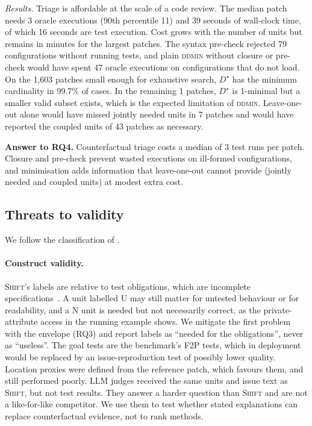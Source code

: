 \documentclass[a4paper,fleqn]{cas-sc}
\newcommand{\tool}{\textsc{Shift}}
\newcommand{\lab}[1]{\textsf{#1}}
\newcommand{\rqfourCallsMedian}{3}
\newcommand{\rqfourCallsPninety}{11}
\newcommand{\rqfourCoupled}{43}
\newcommand{\rqfourExhLarger}{1}
\newcommand{\rqfourExhMatch}{99.7\%}
\newcommand{\rqfourExhN}{1{,}603}
\newcommand{\rqfourOracleSecMedian}{16}
\newcommand{\rqfourPatchesJ}{7}
\newcommand{\rqfourPlainInvalid}{47}
\newcommand{\rqfourPrecheck}{79}
\newcommand{\rqfourWallMedian}{39}
\begin{document}
\emph{Results.} Triage is affordable at the scale of a code review. The median patch needs \rqfourCallsMedian{} oracle executions (90th percentile \rqfourCallsPninety{}) and \rqfourWallMedian{} seconds of wall-clock time, of which \rqfourOracleSecMedian{} seconds are test execution. Cost grows with the number of units but remains in minutes for the largest patches. The syntax pre-check rejected \rqfourPrecheck{} configurations without running tests, and plain \textsc{ddmin} without closure or pre-check would have spent \rqfourPlainInvalid{} oracle executions on configurations that do not load. On the \rqfourExhN{} patches small enough for exhaustive search, $D^\star$ has the minimum cardinality in \rqfourExhMatch{} of cases. In the remaining \rqfourExhLarger{} patches, $D^\star$ is 1-minimal but a smaller valid subset exists, which is the expected limitation of \textsc{ddmin}. Leave-one-out alone would have missed jointly needed units in \rqfourPatchesJ{} patches and would have reported the coupled units of \rqfourCoupled{} patches as necessary.

\begin{answerbox}\textbf{Answer to RQ4.} Counterfactual triage costs a median of \rqfourCallsMedian{} test runs per patch. Closure and pre-check prevent wasted executions on ill-formed configurations, and minimisation adds information that leave-one-out cannot provide (jointly needed and coupled units) at modest extra cost.\end{answerbox}


\subsection{Threats to validity}\label{sec:threats}

We follow the classification of \citet{wohlin2012experimentation}.

\paragraph{Construct validity.} \tool{}'s labels are relative to test obligations, which are incomplete specifications~\citep{barr2015oracle}. A unit labelled \lab{U} may still matter for untested behaviour or for readability, and a \lab{N} unit is needed but not necessarily correct, as the private-attribute access in the running example shows. We mitigate the first problem with the envelope (RQ3) and report labels as ``needed for the obligations'', never as ``useless''. The goal tests are the benchmark's F2P tests, which in deployment would be replaced by an issue-reproduction test of possibly lower quality. Location proxies were defined from the reference patch, which favours them, and still performed poorly. LLM judges received the same units and issue text as \tool{}, but not test results. They answer a harder question than \tool{} and are not a like-for-like competitor. We use them to test whether stated explanations can replace counterfactual evidence, not to rank methods.
\end{document}
